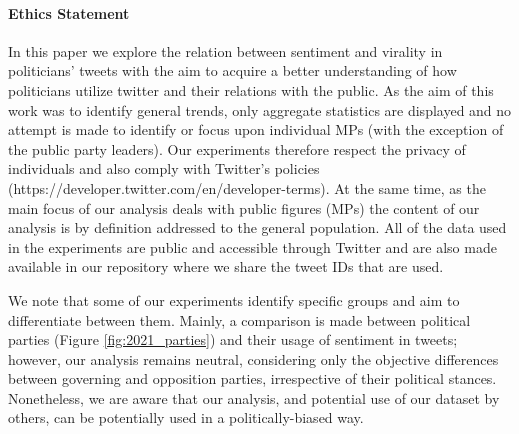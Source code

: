\paragraph{Ethics Statement}
In this paper we explore the relation between sentiment and virality in politicians' tweets with the aim to acquire a better understanding of how politicians utilize twitter and their relations with the public. As the aim of this work was to identify general trends, only aggregate statistics are displayed and no attempt is made to identify or focus upon individual \acp{MP} (with the exception of the public party leaders). Our experiments therefore respect the privacy of individuals and also comply with Twitter's policies (https://developer.twitter.com/en/developer-terms). At the same time, as the main focus of our analysis deals with public figures (\acp{MP}) the content of our analysis is by definition addressed to the general population. All of the data used in the experiments are public and accessible through Twitter and are also made available in our repository where we share the tweet IDs that are used. 

We note that some of our experiments identify specific groups and aim to differentiate between them. Mainly, a comparison is made between political parties (Figure \ref{fig:2021_parties}) and their usage of sentiment in tweets; however, our analysis remains neutral, considering only the objective differences between governing and opposition parties, irrespective of their political stances. Nonetheless, we are aware that our analysis, and potential use of our dataset by others, can be potentially used in a politically-biased way.


